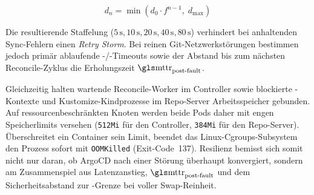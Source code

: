 \begin{equation}
d_n = \min(d_0 \cdot f^{n-1},\; d_{\max})
\label{eq:exponential-backoff}
\end{equation}

Die resultierende Staffelung ($5\,\text{s}, 10\,\text{s}, 20\,\text{s}, 40\,\text{s}, 80\,\text{s}$) verhindert bei anhaltenden Sync-Fehlern einen \textit{Retry Storm}.\autocite[Kap.~22, S.~259--272]{beyer_sre_2016} Bei reinen Git-Netzwerkstörungen bestimmen jedoch primär ablaufende -/-Timeouts sowie der Abstand bis zum nächsten Reconcile-Zyklus die Erholungszeit $\text{\gl{mttr}}_{\text{post-fault}}$.

Gleichzeitig halten wartende Reconcile-Worker im Controller sowie blockierte -Kontexte und Kustomize-Kindprozesse im Repo-Server Arbeitsspeicher gebunden. Auf ressourcenbeschränkten Knoten werden beide Pods daher mit engen Speicherlimits versehen (\texttt{512Mi} für den Controller, \texttt{384Mi} für den Repo-Server). Überschreitet ein Container sein Limit, beendet das Linux-Cgroups-Subsystem den Prozess sofort mit \texttt{OOMKilled} (Exit-Code~137).\autocite[Kap.~5]{burns_kubernetes_2022} Resilienz bemisst sich somit nicht nur daran, ob ArgoCD nach einer Störung überhaupt konvergiert, sondern am Zusammenspiel aus Latenzanstieg, $\text{\gl{mttr}}_{\text{post-fault}}$ und dem Sicherheitsabstand zur -Grenze bei voller Swap-Reinheit.
